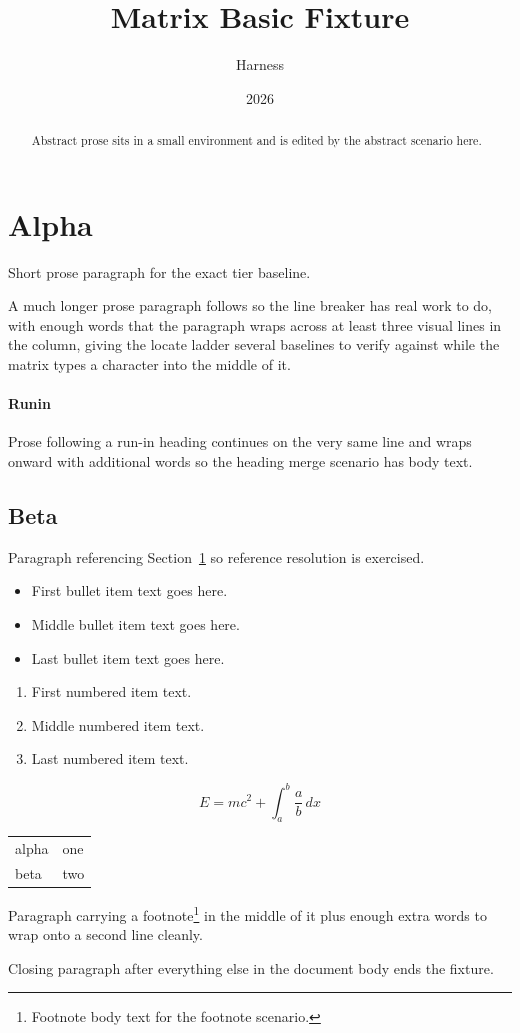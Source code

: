 \documentclass{article}
\title{Matrix Basic Fixture}
\author{Harness}
\date{2026}
\begin{document}
\maketitle

\begin{abstract}
Abstract prose sits in a small environment and is edited by the abstract scenario here.
\end{abstract}

\section{Alpha}
\label{sec:alpha}

Short prose paragraph for the exact tier baseline.

A much longer prose paragraph follows so the line breaker has real work to do, with
enough words that the paragraph wraps across at least three visual lines in the
column, giving the locate ladder several baselines to verify against while the
matrix types a character into the middle of it.

\paragraph{Runin} Prose following a run-in heading continues on the very same line
and wraps onward with additional words so the heading merge scenario has body text.

\subsection{Beta}

Paragraph referencing Section~\ref{sec:alpha} so reference resolution is exercised.

\begin{itemize}
\item First bullet item text goes here.
\item Middle bullet item text goes here.
\item Last bullet item text goes here.
\end{itemize}

\begin{enumerate}
\item First numbered item text.
\item Middle numbered item text.
\item Last numbered item text.
\end{enumerate}

\begin{equation}
E = m c^2 + \int_a^b \frac{a}{b} \, dx
\end{equation}

\begin{tabular}{ll}
alpha & one \\
beta & two \\
\end{tabular}

Paragraph carrying a footnote\footnote{Footnote body text for the footnote scenario.}
in the middle of it plus enough extra words to wrap onto a second line cleanly.

Closing paragraph after everything else in the document body ends the fixture.
\end{document}
